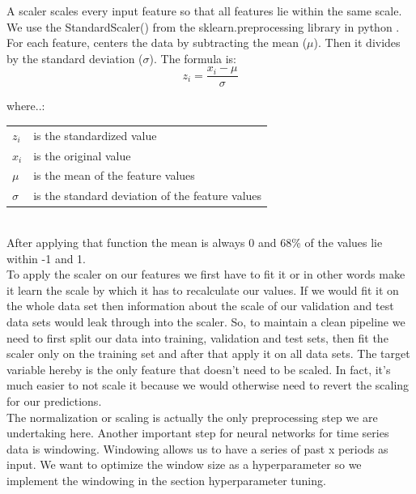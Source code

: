 \documentclass[a4paper,12pt]{report}
\begin{document}
\begin{minipage}{\textwidth}
A scaler scales every input feature so that all features lie within the same scale. We use the StandardScaler() from the sklearn.preprocessing library in python \cite{49}. For each feature, centers the data by subtracting the mean ($\mu$). Then it divides by the standard deviation ($\sigma$). The formula is:\\



\[
z_i = \frac{x_i - \mu}{\sigma}
\]

where..:

\begin{tabularx}{\textwidth}{@{}l@{\hspace{2em}--\hspace{2em}}X@{}}
  $z_i$      & is the standardized value \\
  $x_i$      & is the original value \\
  $\mu$      & is the mean of the feature values \\
  $\sigma$   & is the standard deviation of the feature values \\
\end{tabularx}
\end{minipage}\\

After applying that function the mean is always 0 and 68\% of the values lie within -1 and 1.\\
To apply the scaler on our features we first have to fit it or in other words make it learn the scale by which it has to recalculate our values. If we would fit it on the whole data set then information about the scale of our validation and test data sets would leak through into the scaler. So, to maintain a clean pipeline we need to first split our data into training, validation and test sets, then fit the scaler only on the training set and after that apply it on all data sets. The target variable hereby is the only feature that doesn’t need to be scaled. In fact, it’s much easier to not scale it because we would otherwise need to revert the scaling for our predictions. \\
The normalization or scaling is actually the only preprocessing step we are undertaking here. Another important step for neural networks for time series data is windowing. Windowing allows us to have a series of past x periods as input. We want to optimize the window size as a hyperparameter so we implement the windowing in the section hyperparameter tuning. 
\end{document}
